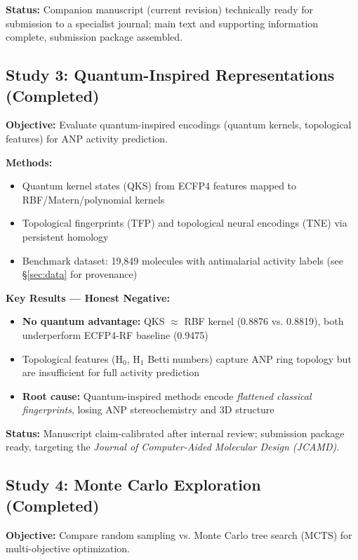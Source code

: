 \documentclass[11pt,a4paper]{article}
\begin{document}
\textbf{Status:} Companion manuscript (current revision) technically ready for submission to a specialist journal; main text and supporting information complete, submission package assembled.

\subsection{Study 3: Quantum-Inspired Representations (Completed)}

\textbf{Objective:} Evaluate quantum-inspired encodings (quantum kernels, topological features) for ANP activity prediction.

\textbf{Methods:}
\begin{itemize}
    \item Quantum kernel states (QKS) from ECFP4 features mapped to RBF/Matern/polynomial kernels
    \item Topological fingerprints (TFP) and topological neural encodings (TNE) via persistent homology
    \item Benchmark dataset: 19,849 molecules with antimalarial activity labels (see \S\ref{sec:data} for provenance)
\end{itemize}

\textbf{Key Results --- Honest Negative:}
\begin{itemize}
    \item \textbf{No quantum advantage:} QKS $\approx$ RBF kernel (0.8876 vs. 0.8819), both underperform ECFP4-RF baseline (0.9475)
    \item Topological features (H$_0$, H$_1$ Betti numbers) capture ANP ring topology but are insufficient for full activity prediction
    \item \textbf{Root cause:} Quantum-inspired methods encode \textit{flattened classical fingerprints}, losing ANP stereochemistry and 3D structure
\end{itemize}

\textbf{Status:} Manuscript claim-calibrated after internal review; submission package ready, targeting the \textit{Journal of Computer-Aided Molecular Design (JCAMD)}.

\subsection{Study 4: Monte Carlo Exploration (Completed)}

\textbf{Objective:} Compare random sampling vs. Monte Carlo tree search (MCTS) for multi-objective optimization.
\end{document}

